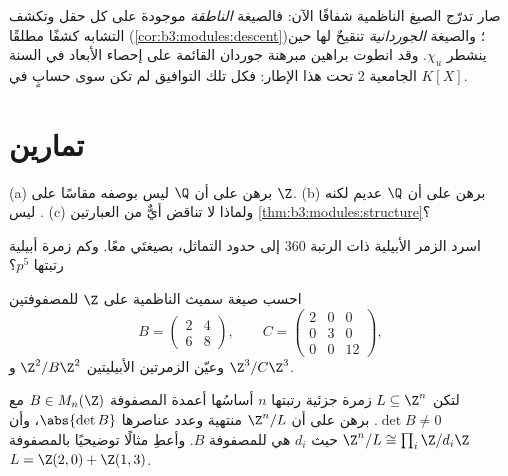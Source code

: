 \begin{remark}\label{rem:b3:modules:overview}
صار تدرّج الصيغ الناظمية شفافًا الآن: فالصيغة \emph{الناطقة}
موجودة على كل حقل وتكشف التشابه كشفًا مطلقًا (\cref{cor:b3:modules:descent})؛
والصيغة \emph{الجوردانية} تنقيحٌ لها حين ينشطر $\chi_u$. وقد
انطوت براهين مبرهنة جوردان القائمة على إحصاء الأبعاد في السنة
الجامعية 2 تحت هذا الإطار: فكل تلك التوافيق لم تكن سوى حسابٍ في
 $K[X]$.
\end{remark}

\section{تمارين}

\begin{exercise}[$\star$]\label{exo:b3:modules:1}
(a) برهن على أن $\Q$ ليس  بوصفه
مقاسًا على $\Z$.
(b) برهن على أن $\Q$ عديم  لكنه ليس .
(c) ولماذا لا تناقض أيٌّ من العبارتين \cref{thm:b3:modules:structure}؟
\end{exercise}

\begin{exercise}[$\star$]\label{exo:b3:modules:2}
اسرد الزمر الأبيلية ذات الرتبة $360$ إلى حدود التماثل، بصيغتَي
  معًا. وكم زمرة أبيلية رتبتها
$p^5$؟
\end{exercise}

\begin{exercise}[$\star$]\label{exo:b3:modules:3}
احسب صيغة سميث الناظمية على $\Z$ للمصفوفتين
\[
B = \begin{pmatrix} 2 & 4\\ 6 & 8 \end{pmatrix},
\qquad
C = \begin{pmatrix} 2 & 0 & 0\\ 0 & 3 & 0\\ 0 & 0 & 12
\end{pmatrix},
\]
وعيّن الزمرتين الأبيليتين $\Z^2/B\Z^2$ و $\Z^3/C\Z^3$.
\end{exercise}

\begin{exercise}[$\star\star$]\label{exo:b3:modules:4}
لتكن $L \subseteq \Z^n$ زمرة جزئية رتبتها $n$ أساسُها أعمدة المصفوفة
$B \in M_n(\Z)$ مع $\det B \neq 0$. برهن على أن $\Z^n/L$ منتهية
وعدد عناصرها $\abs{\det B}$، وأن $\Z^n/L
\cong \prod_i \Z/d_i\Z$ حيث $d_i$ هي  للمصفوفة $B$. وأعطِ مثالًا توضيحيًا بالمصفوفة $L = \Z(2,0) + \Z(1,3)$.
\end{exercise}

